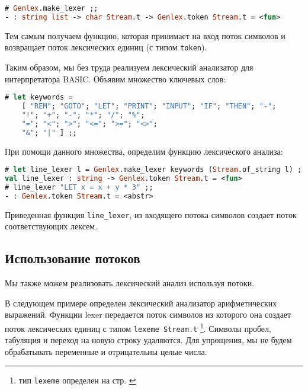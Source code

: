 \begin{lstlisting}[language=Caml]
# Genlex.make_lexer ;;
- : string list -> char Stream.t -> Genlex.token Stream.t = <fun>
\end{lstlisting}

Тем самым получаем функцию, которая принимает на вход поток символов и
возвращает поток лексических единиц (с типом \texttt{token}).

Таким образом, мы без труда реализуем лексический анализатор для интерпретатора
BASIC. Объявим множество ключевых слов:

\begin{lstlisting}[language=Caml]
# let keywords =
    [ "REM"; "GOTO"; "LET"; "PRINT"; "INPUT"; "IF"; "THEN"; "-";
    "!"; "+"; "-"; "*"; "/"; "%";
    "="; "<"; ">"; "<="; ">="; "<>";
    "&"; "|" ] ;;
\end{lstlisting}

При помощи данного множества, определим функцию лексического анализа:

\begin{lstlisting}[language=Caml]
# let line_lexer l = Genlex.make_lexer keywords (Stream.of_string l) ;;
val line_lexer : string -> Genlex.token Stream.t = <fun>
# line_lexer "LET x = x + y * 3" ;;
- : Genlex.token Stream.t = <abstr>
\end{lstlisting}

Приведенная функция \texttt{line\_lexer}, из входящего потока символов создает
поток соответствующих лексем.

\subsection{Использование потоков}

Мы также можем реализовать лексический анализ  используя потоки.

В следующем примере определен лексический анализатор арифметических выражений.
Функции lexer передается поток символов из которого она создает поток
лексических единиц с типом \texttt{lexeme Stream.t} \footnote{тип
\texttt{lexeme} определен на стр. \cite{??}}. Символы пробел, табуляция и
переход на новую строку удаляются. Для упрощения, мы не будем обрабатывать
переменные и отрицательны целые числа.

